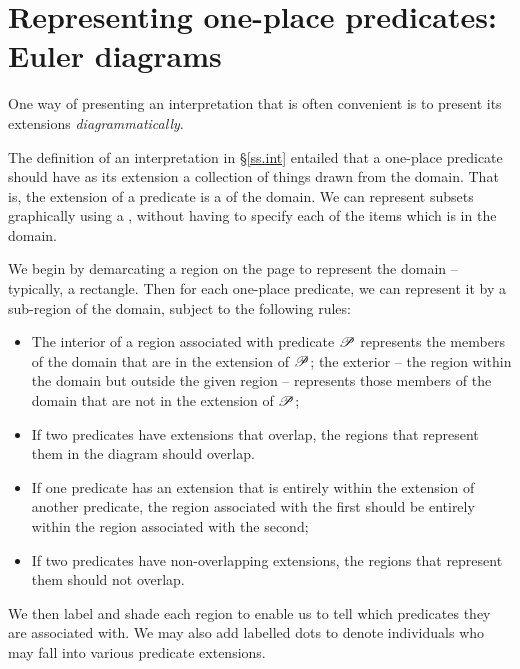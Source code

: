 \section{Representing one-place predicates: Euler diagrams}\label{euler}

One way of presenting an interpretation that is often convenient is to present its extensions \emph{diagrammatically}. 

The definition of an interpretation in §\ref{ss.int} entailed that a one-place predicate should have as its extension a collection of things drawn from the domain. That is, the extension of a predicate is a  of the domain. We can represent subsets graphically using a , without having to specify each of the items which is in the domain.

We begin by demarcating a region on the page to represent the domain – typically, a rectangle. Then for each one-place predicate, we can represent it by a sub-region of the domain, subject to the following rules: \begin{itemize}
\item The interior of a region associated with predicate $\mathscr{P}$ represents the members of the domain that are in the extension of $\mathscr{P}$; the exterior – the region within the domain but outside the given region – represents those members of the domain that are not in the extension of $\mathscr{P}$;
	\item If two predicates have extensions that overlap, the regions that represent them in the diagram should overlap.
	\item If one predicate has an extension that is entirely within the extension of another predicate, the region associated with the first should be entirely within the region associated with the second;
	\item If two predicates have non-overlapping extensions, the regions that represent them should not overlap.
\end{itemize} We then label and shade each region to enable us to tell which predicates they are associated with. We may also add labelled dots to denote individuals who may fall into various predicate extensions.

